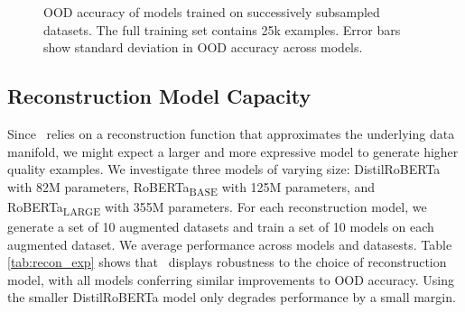 \begin{figure}[t]
\centering
{}
\caption{OOD accuracy of models trained on successively subsampled datasets. The full training set contains 25k examples. Error bars show standard deviation in OOD accuracy across models.}
\label{fig:dset_exp}
\end{figure}



\subsection{Reconstruction Model Capacity}
\label{subsec:capacity_exp}
Since \ssmba\ relies on a reconstruction function that approximates the underlying data manifold, we might expect a larger and more expressive model to generate higher quality examples.
We investigate three models of varying size: DistilRoBERTa \citep{sanh2019distilbert} with 82M parameters, RoBERTa\textsubscript{BASE} with 125M parameters, and RoBERTa\textsubscript{LARGE} with 355M parameters. 
For each reconstruction model, we generate a set of 10 augmented datasets and train a set of 10 models on each augmented dataset. We average performance across models and datasests.
Table \ref{tab:recon_exp} shows that \ssmba\ displays robustness to the choice of reconstruction model, with all models conferring similar improvements to OOD accuracy. Using the smaller DistilRoBERTa model only degrades performance by a small margin.

